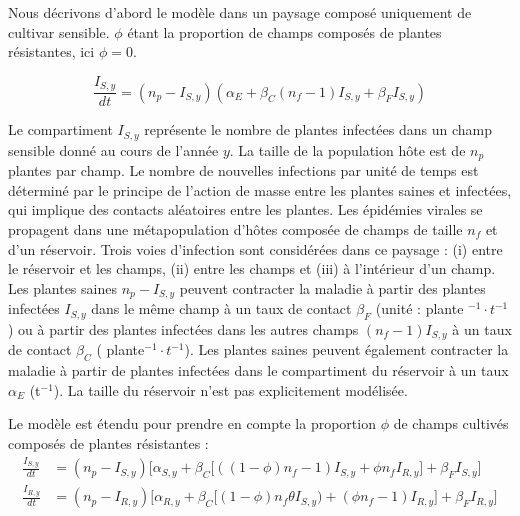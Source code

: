 	Nous décrivons d'abord le modèle dans un paysage composé uniquement de cultivar sensible. $\phi$ étant la proportion de champs composés de  plantes résistantes, ici $\phi = 0$.
	
	
	\begin{equation}
	\frac{I_{S,y}}{dt} = (n_p - I_{S,y})(\alpha_{E} + \beta_C (n_f -1) I_{S,y} + \beta_F I_{S,y})
	\label{sys4}
	\end{equation}
	
	
	Le compartiment $I_{S,y}$ représente  le nombre de plantes infectées dans un champ sensible donné au cours de l'année $y$. La taille de la population hôte est de $n_p$ plantes par champ. Le nombre de nouvelles infections par unité de temps est déterminé par le principe de l'action de masse entre les plantes saines et infectées, qui implique des contacts aléatoires entre les plantes.   Les épidémies virales se propagent dans une métapopulation d'hôtes composée de champs de taille $n_f$  et d'un réservoir.  Trois voies d'infection sont considérées dans ce paysage :  (i) entre le réservoir et les champs, (ii) entre les champs et (iii) à l'intérieur d'un champ. Les plantes saines $n_p - I_{S,y}$ peuvent contracter la maladie à partir des plantes  infectées $I_{S,y}$ dans le même champ à un taux de contact $\beta_F $ (unité : plante $^{-1} \cdot t^{-1}$)  ou à partir des plantes infectées dans les autres champs $(n_f -1) I_{S,y}$  à un taux de contact $\beta_C$ ( plante$^{-1} \cdot t^{-1}$).  Les plantes saines peuvent également contracter la maladie à partir de plantes infectées dans le compartiment du réservoir à un taux $\alpha_E$ (t$^{-1}$). La taille du réservoir n'est pas explicitement modélisée.
	
	Le modèle est étendu pour prendre en compte la proportion $\phi$ de champs cultivés composés de plantes résistantes : 
	\begin{align}
	\frac{I_{S,y}}{dt} &= (n_p - I_{S,y})\big[\alpha_{S,y} + \beta_C \big[((1-\phi)n_f -1) I_{S,y} + \phi n_f I_{R,y}\big] + \beta_F I_{S,y}\big] \label{sys5} \\ 
	\frac{I_{R,y}}{dt} &= (n_p - I_{R,y})\big[\alpha_{R,y} + \beta_C \big[(1-\phi)n_f \theta I_{S,y}) + (\phi n_f -1) I_{R,y} \big] + \beta_F I_{R,y}\big] \label{sys7} 
	\end{align}
	

